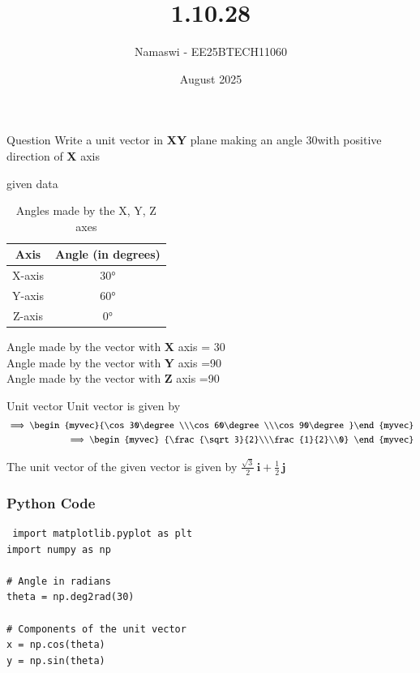 \documentclass{beamer}
\title %
{1.10.28}
\date{August  2025}
\author %
{Namaswi - EE25BTECH11060}
\begin{document}
\frame{\titlepage}
\begin{frame}{Question}
Write a unit vector in \textbf{XY} plane making an angle 30\degree with positive direction of \textbf{X} axis
\end{frame}
 
\begin{frame}{given data}
\begin{table}[ht]
\centering
\begin{tabular}{|c|c|}
\hline
\textbf{Axis} & \textbf{Angle (in degrees)} \\
\hline
X-axis & 30° \\
Y-axis & 60° \\
Z-axis & 0° \\
\hline
\end{tabular}
\caption{Angles made by the X, Y, Z axes}
\end{table}

 Angle made by the vector with \textbf{X} axis = 30\degree\\
Angle made by the vector with \textbf{Y} axis =90\degree\\
Angle made by the vector with \textbf{Z} axis =90\degree\\
\end{frame}
\begin{frame}{Unit vector}
 Unit vector is given by 
\begin{align*}
\implies
    \begin{myvec}{\cos30\degree\\\cos60\degree\\\cos90\degree}\end{myvec}\\
    \implies
    \begin{myvec}
       {\frac{\sqrt3}{2}\\\frac{1}{2}\\0}
    \end{myvec}
\end{align*}

 
 The unit  vector of the given vector is given by
 $\frac{\sqrt{3}}{2}\,\mathbf{i} + \frac{1}{2}\,\mathbf{j}$


\end{frame}

\begin{frame}[fragile]
    \frametitle{Python Code}
    \begin{lstlisting}
 import matplotlib.pyplot as plt
import numpy as np

# Angle in radians
theta = np.deg2rad(30)

# Components of the unit vector
x = np.cos(theta)
y = np.sin(theta)

\end{lstlisting}
\end{frame}
\end{document}
